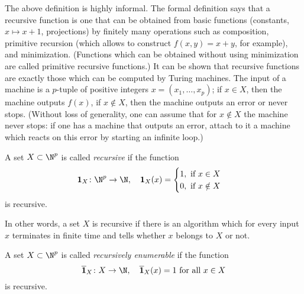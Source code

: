\begin{page}

The above definition is highly informal.
The formal definition says that a recursive function is one that can be obtained from basic functions
(constants, $x \mapsto x+1$, projections) by finitely many operations such as composition,
primitive recursion (which allows to construct $f(x,y) = x+y$, for example), and minimization.
(Functions which can be obtained without using minimization are called primitive recursive functions.)
It can be shown that recursive functions are exactly those which can be computed by Turing machines.
The input of a machine is a $p$-tuple of positive integers $x = (x_1, \ldots, x_p)$;
if $x \in X$, then the machine outputs $f(x)$, if $x \notin X$, then the machine outputs an error or never stops.
(Without loss of generality, one can assume that for $x \notin X$ the machine never stops: if one has a machine that outputs an error,
attach to it a machine which reacts on this error by starting an infinite loop.)



\end{page}

\begin{page}

\begin{dfn}
A set $X \subset \N^p$ is called \emph{recursive} if the function
\[
\mathbf{1}_X \colon \N^p \to \N, \quad \mathbf{1}_X(x) =
\begin{cases}
1, \text{ if }x \in X\\
0, \text{ if }x \notin X
\end{cases}
\]
is recursive.
\end{dfn}

\end{page}

\begin{page}

In other words, a set $X$ is recursive if there is an algorithm which for every input $x$ terminates in finite time and tells whether $x$ belongs to $X$ or not.


\end{page}

\begin{page}

\begin{dfn}
A set $X \subset \N^p$ is called \emph{recursively enumerable} if the function
\[
\overline{\mathbf{1}}_X \colon X \to \N, \quad \overline{\mathbf{1}}_X(x) = 1 \text{ for all }x \in X
\]
is recursive.
\end{dfn}

\end{page}

